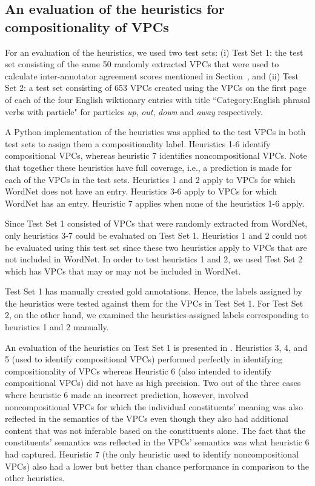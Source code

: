 \documentclass[output=paper
,modfonts
,nonflat]{langsci/langscibook}
\begin{document}
\subsection{An evaluation of the heuristics for compositionality of VPCs} \label{sec:eval}

For an evaluation of the heuristics, we used two test sets: (i) Test Set 1: the test set consisting of the same 50 randomly extracted VPCs that were used to calculate inter-annotator agreement scores mentioned in Section~, and (ii) Test Set 2: a test set consisting of 653 VPCs created using the VPCs on the first page of each of the four English wiktionary entries with title ``Category:English phrasal verbs with particle" for particles \textit{up}, \textit{out}, \textit{down} and \textit{away} respectively.

A Python implementation of the heuristics was applied to the test VPCs in both test sets to assign them a compositionality label. Heuristics 1-6 identify compositional VPCs, whereas heuristic 7 identifies noncompositional VPCs. Note that together these heuristics have full coverage, i.e., a prediction is made for each of the VPCs in the test sets. Heuristics 1 and 2 apply to VPCs for which WordNet does not have an entry.  Heuristics 3-6 apply to VPCs for which WordNet has an entry. Heuristic 7 applies when none of the heuristics 1-6 apply.

Since Test Set 1 consisted of VPCs that were randomly extracted from WordNet, only heuristics 3-7 could be evaluated on Test Set 1. Heuristics 1 and 2 could not be evaluated using this test set since these two heuristics apply to VPCs that are not included in WordNet. In order to test heuristics 1 and 2, we used Test Set 2 which has VPCs that may or may not be included in WordNet. 

Test Set 1 has manually created gold annotations. Hence, the labels assigned by the heuristics were tested against them 
for the VPCs in Test Set 1. For Test Set 2, on the other hand, we examined the heuristics-assigned labels corresponding to heuristics 1 and 2 manually. 
 

An evaluation of the heuristics on Test Set 1 is presented in . Heuristics 3, 4, and 5 (used to identify compositional VPCs) performed perfectly in identifying compositionality of VPCs whereas Heuristic 6 (also intended to identify compositional VPCs) did not have as high precision. Two out of the three cases where heuristic 6 made an incorrect prediction, however, involved noncompositional VPCs for which the individual constituents' meaning was also reflected in the semantics of the VPCs even though they also had additional content that was not inferable based on the constituents alone. The fact that the constituents' semantics was reflected in the VPCs' semantics was what heuristic 6 had captured. Heuristic 7 (the only heuristic used to identify noncompositional VPCs) also had a lower but better than chance performance in comparison to the other heuristics. 
\end{document}
